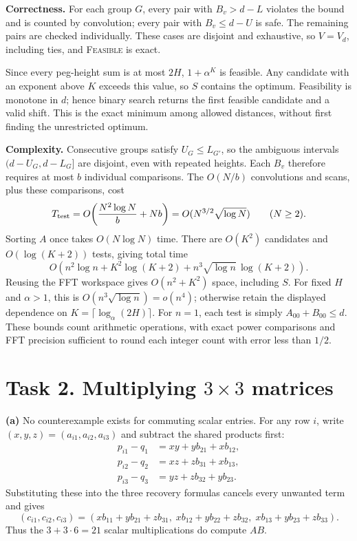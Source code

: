 \documentclass[11pt]{article}
\begin{document}
\newpage
\textbf{Correctness.}
For each group $G$, every pair with $B_v>d-L$ violates the bound and is
counted by convolution; every pair with $B_v\le d-U$ is safe.
The remaining pairs are checked individually. These cases are disjoint
and exhaustive, so $V=V_d$, including ties, and \textsc{Feasible} is exact.

Since every peg-height sum is at most $2H$, $1+\alpha^K$ is feasible.
Any candidate with an exponent above $K$ exceeds this value, so $S$
contains the optimum. Feasibility is monotone in $d$; hence binary search
returns the first feasible candidate and a valid shift. This is the exact
minimum among allowed distances, without first finding the unrestricted
optimum.

\textbf{Complexity.}
Consecutive groups satisfy $U_G\le L_{G'}$, so the ambiguous intervals
$(d-U_G,d-L_G]$ are disjoint, even with repeated heights.
Each $B_v$ therefore requires at most $b$ individual comparisons.
The $O(N/b)$ convolutions and scans, plus these comparisons, cost
\[
 T_{\rm test}=O\!\left(\frac{N^2\log N}{b}+Nb\right)
 =O(N^{3/2}\sqrt{\log N})\qquad(N\ge2).
\]
Sorting $A$ once takes $O(N\log N)$ time. There are $O(K^2)$ candidates
and $O(\log(K+2))$ tests, giving total time
\[
 \boxed{O\!\left(n^2\log n+K^2\log(K+2)
       +n^3\sqrt{\log n}\,\log(K+2)\right).}
\]
Reusing the FFT workspace gives $O(n^2+K^2)$ space, including $S$.
For fixed $H$ and $\alpha>1$, this is $O(n^3\sqrt{\log n})=o(n^4)$;
otherwise retain the displayed dependence on $K=\lceil\log_\alpha(2H)\rceil$.
For $n=1$, each test is simply $A_{00}+B_{00}\le d$.
These bounds count arithmetic operations, with exact power comparisons
and FFT precision sufficient to round each integer count with error
less than $1/2$.

\newpage
\section*{Task 2. Multiplying $3\times3$ matrices}

\textbf{(a)} No counterexample exists for commuting scalar entries.
For any row $i$, write $(x,y,z)=(a_{i1},a_{i2},a_{i3})$ and subtract the
shared products first:
\begin{align*}
 p_{i1}-q_1&=xy+yb_{21}+xb_{12},\\
 p_{i2}-q_2&=xz+zb_{31}+xb_{13},\\
 p_{i3}-q_3&=yz+zb_{32}+yb_{23}.
\end{align*}
Substituting these into the three recovery formulas cancels every unwanted
term and gives
\[
 (c_{i1},c_{i2},c_{i3})
 =(xb_{11}+yb_{21}+zb_{31},\;
   xb_{12}+yb_{22}+zb_{32},\;
   xb_{13}+yb_{23}+zb_{33}).
\]
Thus the $3+3\cdot6=21$ scalar multiplications do compute $AB$.
\end{document}
